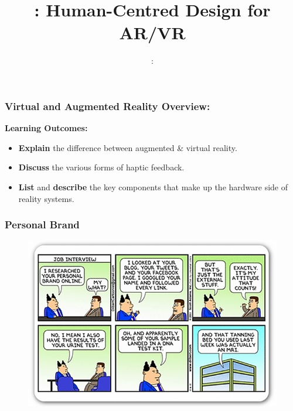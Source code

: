 \usepackage{../../beamerthemeFalmouthGamesAcademy}
\usepackage{multimedia}
\usepackage{soul}
\usepackage{tikz}
\usepackage{verbatim}
\graphicspath{ {../../} }


\usepackage[normalem]{ulem}
\usepackage{wasysym}

\usepackage{pdfpages}

\usetikzlibrary{arrows,automata}




\title{\sessionnumber: \normalsize{Human-Centred Design for AR/VR}}
\subtitle{\modulecode: \moduletitle}

\frame{\titlepage} 
\begin{frame}
	\frametitle{Virtual and Augmented Reality Overview:}
	
	\textbf{Learning Outcomes:}
	
	\begin{itemize}
		\item \textbf{Explain} the difference between augmented \& virtual reality. 
		\item \textbf{Discuss} the various forms of haptic feedback.
		\item \textbf{List} and \textbf{describe} the key components that make up the hardware side of reality systems.	
	\end{itemize}
\end{frame}

\begin{frame}
	\frametitle{Personal Brand}
	\begin{figure}
		\includegraphics[scale=.5]{assets/personal-brand}
	\end{figure}
\end{frame}

